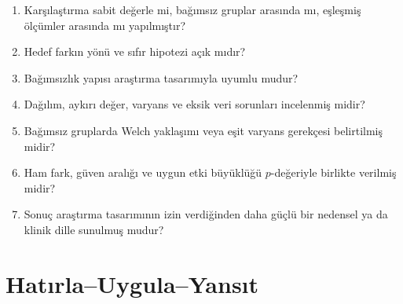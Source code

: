 \begin{enumerate}
  \item Karşılaştırma sabit değerle mi, bağımsız gruplar arasında mı, eşleşmiş ölçümler arasında mı yapılmıştır?
  \item Hedef farkın yönü ve sıfır hipotezi açık mıdır?
  \item Bağımsızlık yapısı araştırma tasarımıyla uyumlu mudur?
  \item Dağılım, aykırı değer, varyans ve eksik veri sorunları incelenmiş midir?
  \item Bağımsız gruplarda Welch yaklaşımı veya eşit varyans gerekçesi belirtilmiş midir?
  \item Ham fark, güven aralığı ve uygun etki büyüklüğü $p$-değeriyle birlikte verilmiş midir?
  \item Sonuç araştırma tasarımının izin verdiğinden daha güçlü bir nedensel ya da klinik dille sunulmuş mudur?
\end{enumerate}




\section*{Hatırla--Uygula--Yansıt}

